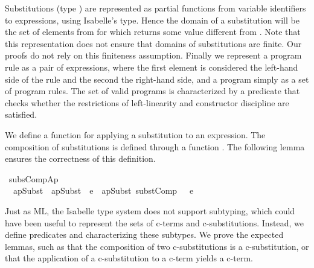 \documentclass{llncs}
\newenvironment{isacode}
{\begin{list}{}{
\setlength{\leftmargin}{4pt}
\setlength{\rightmargin}{0pt}
\setlength{\listparindent}{0pt}\raggedright
\setlength{\itemsep}{0pt}
\setlength{\parsep}{0pt}
\normalfont\ttfamily }\item[]}
{\end{list}}
\begin{document}
Substitutions (type ) are represented as partial
functions from variable identifiers to expressions, using Isabelle's
 type. Hence the domain of a substitution
{\isasymtheta} will be the set of elements from  for
which {\isasymtheta} returns some value different from .
Note that this representation does not ensure that domains of
substitutions are finite. Our proofs do not rely on this finiteness assumption.
Finally we represent a program rule as a pair of expressions, where
the first element is considered the left-hand side of the rule and the
second the right-hand side, and a program
simply as a set of program rules. The set of valid \crwl{} programs is
characterized by a predicate 
that checks whether the restrictions of left-linearity and constructor
discipline are satisfied.

We define a function
for applying a substitution to an expression. The composition of
substitutions is defined through a function
.
The following lemma ensures the correctness of this definition.

\medskip

\begin{minipage}{\linewidth}
\begin{isacode}
\isamarkupfalse \ subsCompAp\ {\isacharcolon}\\
\ \ {\isachardoublequoteopen}{\isacharparenleft}apSubst\ {\isasymtheta}\ {\isacharparenleft}apSubst\ {\isasymsigma}\ e{\isacharparenright}{\isacharparenright}\ {\isacharequal}\ {\isacharparenleft}apSubst\ {\isacharparenleft}substComp\ {\isasymtheta}\ {\isasymsigma}{\isacharparenright}\ e{\isacharparenright}{\isachardoublequoteclose}\end{isacode}
\end{minipage}

\medskip

\noindent Just as ML, the Isabelle type system does not support subtyping, which
could have been useful to represent the sets of c-terms and
c-substitutions. Instead, we define predicates \isaelem{cterm} and
\isaelem{csubst} characterizing these
subtypes. We prove the expected lemmas, such as that the composition of two
c-substitutions is a c-substitution, or that the application of a
c-substitution to a c-term yields a c-term.
\end{document}
